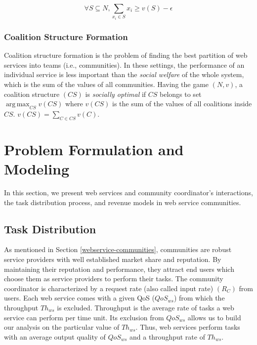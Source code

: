 \documentclass[10pt,journal,cspaper,compsoc]{IEEEtran}
\begin{document}
\begin{equation}\label{eq:core2}
\forall S \subseteq N, \sum_{x_i \in S} x_i \geq v(S) - \epsilon
\end{equation}

\subsubsection*{Coalition Structure Formation}\label{sec:coalition}

Coalition structure formation is the problem of finding the best
partition of web services into teams (i.e., communities). In these
settings, the performance of an individual service is less
important than the \emph{social welfare} of the whole system,
which is the sum of the values of all communities. Having the game
$(N,v)$, a coalition structure $(CS)$ is \emph{socially optimal}
if $CS$ belongs to set $\operatorname*{arg\,max}_{CS} v(CS)$ where
$v(CS)$ is the sum of the values of all coalitions inside $CS$.
$v(CS) = \sum_{C \in CS}v(C)$.





\section{Problem Formulation and Modeling}\label{s:model}

In this section, we present  web services and community
coordinator's interactions, the task distribution process, and
revenue models in web service communities.

\subsection{Task Distribution}

As mentioned in Section \ref{webservice-communities}, communities
are robust service providers with well established market share
and reputation. By maintaining their reputation and performance,
they attract  end users which choose them as service providers to
perform their tasks. The community coordinator is characterized by a
request rate (also called input rate) $(R_C)$ from users. Each web
service comes with a given QoS ($QoS_{ws}$) from which the
throughput $Th_{ws}$ is excluded. Throughput is the average rate
of tasks a web service can perform per time unit. Its exclusion
from $QoS_{ws}$ allows us to build our analysis on the particular
value of $Th_{ws}$. Thus, web services perform tasks with an
average output quality of $QoS_{ws}$ and a throughput rate of
$Th_{ws}$.
\end{document}

